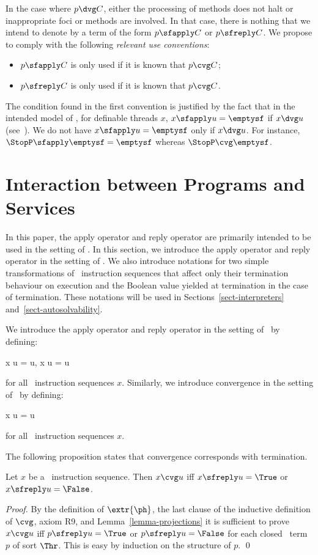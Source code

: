 \documentclass[fleqn]{llncs}
\begin{document}
In the case where $p \dvg C$, either the processing of methods does
not halt or inappropriate foci or methods are involved.
In that case, there is nothing that we intend to denote by a term of the
form $p \sfapply C$ or $p \sfreply C$.
We propose to comply with the following \emph{relevant use conventions}:
\begin{itemize}
\item
$p \sfapply C$ is only used if it is known that $p \cvg C$;
\item
$p \sfreply C$ is only used if it is known that $p \cvg C$.
\end{itemize}
The condition found in the first convention is justified by the fact
that in the intended model of \TAbt, for definable threads $x$,
$x \sfapply u = \emptysf$ if $x \dvg u$ (see~\cite{BM09k}).
We do not have $x \sfapply u = \emptysf$ only if $x \dvg u$.
For instance, $\StopP \sfapply \emptysf = \emptysf$ whereas
$\StopP \cvg \emptysf$.

\section{Interaction between Programs and Services}
\label{sect-PGLBbt-add}

In this paper, the apply operator and reply operator are primarily
intended to be used in the setting of \PGLBbt.
In this section, we introduce the apply operator and reply operator in
the setting of \PGLBbt.
We also introduce notations for two simple transformations of \PGLBbt\
instruction sequences that affect only their termination behaviour on
execution and the Boolean value yielded at termination in the case of
termination.
These notations will be used in Sections~\ref{sect-interpreters}
and~\ref{sect-autosolvability}.

We introduce the apply operator and reply operator in the setting of
\PGAbt\ by defining:
\begin{ldispl}
x \sfapply u =  \sfapply u\;, \quad
x \sfreply u = \extr{x} \sfreply u
\end{ldispl}
for all \PGLBbt\ instruction sequences $x$.
Similarly, we introduce convergence in the setting of \PGAbt\ by
defining:
\begin{ldispl}
x \cvg u =  \cvg u
\end{ldispl}
for all \PGLBbt\ instruction sequences $x$.

The following proposition states that convergence corresponds with
termination.
\begin{proposition}
\label{prop-cvg-sfreply}
Let $x$ be a \PGLBbt\ instruction sequence.
Then $x \cvg u$ iff $x \sfreply u = \True$ or $x \sfreply u = \False$.
\end{proposition}
\begin{proof}
By the definition of $\extr{\ph}$, the last clause of the inductive
definition of $\cvg$, axiom R9, and Lemma~\ref{lemma-projections} it is
sufficient to prove $x \cvg u$ iff $p \sfreply u = \True$ or
$p \sfreply u = \False$ for each closed \BTAbt\ term $p$ of sort $\Thr$.
This is easy by induction on the structure of $p$.
\qed
\end{proof}
\end{document}
